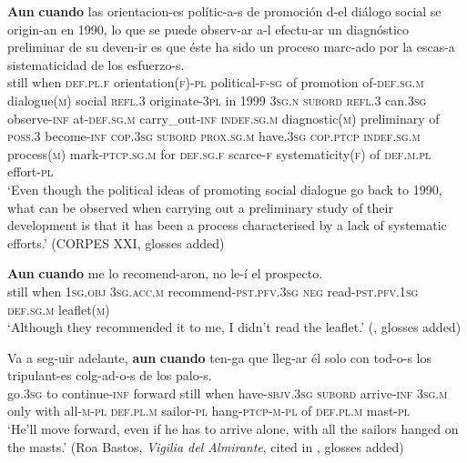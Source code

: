 \begin{exe}
	\ex\label{exAppendixSpanishAunAunCuando1}
	\gll  \textbf{Aun} \textbf{cuando} las orientacion-es polític-a-s de promoción d-el diálogo social se origin-an en 1990, lo que se puede observ-ar a-l efectu-ar un diagnóstico preliminar de su deven-ir es que éste ha sido un proceso marc-ado por la escas-a sistematicidad de los esfuerzo-s.\\
	still when \textsc{def}.\textsc{pl}.\textsc{f} orientation(\textsc{f})-\textsc{pl} political-\textsc{f}-\textsc{sg} of promotion of-\textsc{def}.\textsc{sg}.\textsc{m} dialogue(\textsc{m}) social \textsc{refl}.3 originate-3\textsc{pl} in 1999 3\textsc{sg}.\textsc{n} \textsc{subord} \textsc{refl}.3 can.3\textsc{sg} observe-\textsc{inf} at-\textsc{def}.\textsc{sg}.\textsc{m} carry\_out-\textsc{inf} \textsc{indef}.\textsc{sg}.\textsc{m} diagnostic(\textsc{m}) preliminary of \textsc{poss}.3 become-\textsc{inf} \textsc{cop}.3\textsc{sg} \textsc{subord} \textsc{prox}.\textsc{sg}.\textsc{m} have.3\textsc{sg} \textsc{cop}.\textsc{ptcp} \textsc{indef}.\textsc{sg}.\textsc{m} process(\textsc{m}) mark-\textsc{ptcp}.\textsc{sg}.\textsc{m} for \textsc{def}.\textsc{sg}.\textsc{f} scarce-\textsc{f} systematicity(\textsc{f}) of \textsc{def}.\textsc{m}.\textsc{pl} effort-\textsc{pl}\\
	\glt \lq Even though the political ideas of promoting social dialogue go back to 1990, what can be observed when carrying out a preliminary study of their development is that it has been a process characterised by a lack of systematic efforts.' (CORPES XXI, glosses added)

	\ex\label{exAppendixSpanishAunAunCuando2}
	 \gll \textbf{Aun} \textbf{cuando} me lo recomend-aron, no le-í el prospecto.\\
	still when 1\textsc{sg}.\textsc{obj} 3\textsc{sg}.\textsc{acc}.\textsc{m} recommend-\textsc{pst}.\textsc{pfv}.3\textsc{sg} \textsc{neg} read-\textsc{pst}.\textsc{pfv}.1\textsc{sg} \textsc{def}.\textsc{sg}.\textsc{m} leaflet(\textsc{m})\\
	\glt \lq Although they recommended it to me, I didn't read the leaflet.' (\cite[§47.12.g]{RAEGramatica}, glosses added)

	\ex\label{exAppendixSpanishAunAunCuando3}
	\gll Va a seg-uir adelante, \textbf{aun} \textbf{cuando} ten-ga que lleg-ar él solo con tod-o-s los tripulant-es colg-ad-o-s de los palo-s.\\
	go.3\textsc{sg} to continue-\textsc{inf} forward still when have-\textsc{sbjv}.3\textsc{sg} \textsc{subord} arrive-\textsc{inf} 3\textsc{sg}.\textsc{m} only with all-\textsc{m}-\textsc{pl} \textsc{def}.\textsc{pl}.\textsc{m} sailor-\textsc{pl} hang-\textsc{ptcp}-\textsc{m}-\textsc{pl} of \textsc{def}.\textsc{pl}.\textsc{m} mast-\textsc{pl}\\
\glt \lq He'll move forward, even if he has to arrive alone, with all the sailors hanged on the masts.'
 (Roa Bastos, \textit{Vigilia del Almirante}, cited in \cite[§47.12g]{RAEGramatica}, glosses added)
 

\end{exe}

